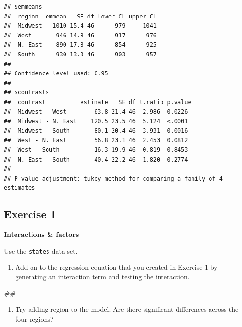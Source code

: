 \documentclass[]{book}
\newenvironment{Shaded}{\begin{snugshade}}{\end{snugshade}}
\newcommand{\CommentTok}[1]{\textcolor[rgb]{0.56,0.35,0.01}{\textit{#1}}}
\newcommand{\DataTypeTok}[1]{\textcolor[rgb]{0.13,0.29,0.53}{#1}}
\newcommand{\KeywordTok}[1]{\textcolor[rgb]{0.13,0.29,0.53}{\textbf{#1}}}
\newcommand{\NormalTok}[1]{#1}
\newcommand{\OperatorTok}[1]{\textcolor[rgb]{0.81,0.36,0.00}{\textbf{#1}}}
\newcommand{\StringTok}[1]{\textcolor[rgb]{0.31,0.60,0.02}{#1}}
\providecommand{\tightlist}{%
  \setlength{\itemsep}{0pt}\setlength{\parskip}{0pt}}
\begin{document}
\begin{Shaded}
\end{Shaded}

\begin{verbatim}
## $emmeans
##  region  emmean   SE df lower.CL upper.CL
##  Midwest   1010 15.4 46      979     1041
##  West       946 14.8 46      917      976
##  N. East    890 17.8 46      854      925
##  South      930 13.3 46      903      957
## 
## Confidence level used: 0.95 
## 
## $contrasts
##  contrast          estimate   SE df t.ratio p.value
##  Midwest - West        63.8 21.4 46  2.986  0.0226 
##  Midwest - N. East    120.5 23.5 46  5.124  <.0001 
##  Midwest - South       80.1 20.4 46  3.931  0.0016 
##  West - N. East        56.8 23.1 46  2.453  0.0812 
##  West - South          16.3 19.9 46  0.819  0.8453 
##  N. East - South      -40.4 22.2 46 -1.820  0.2774 
## 
## P value adjustment: tukey method for comparing a family of 4 estimates
\end{verbatim}

\hypertarget{exercise-1-1}{%
\subsection{Exercise 1}\label{exercise-1-1}}

\textbf{Interactions \& factors}

Use the \texttt{states} data set.

\begin{enumerate}
\def\labelenumi{\arabic{enumi}.}
\tightlist
\item
  Add on to the regression equation that you created in Exercise 1 by generating an interaction term and testing the interaction.
\end{enumerate}

\begin{Shaded}
\begin{Highlighting}[]
\CommentTok{## }
\end{Highlighting}
\end{Shaded}

\begin{enumerate}
\def\labelenumi{\arabic{enumi}.}
\setcounter{enumi}{1}
\tightlist
\item
  Try adding region to the model. Are there significant differences across the four regions?
\end{enumerate}
\end{document}
